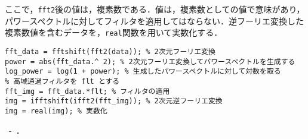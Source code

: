 ここで，\texttt{fft2}後の値は，複素数である．値は，複素数としての値で意味があり，パワースペクトルに対してフィルタを適用してはならない．逆フーリエ変換した複素数値を含むデータを，\texttt{real}関数を用いて実数化する．
\begin{lstlisting}[caption={2次元フーリエ変換と高域通過フィルタ},label={src:2次元フーリエ変換と高域通過フィルタ}]
% 画像データを data とする
fft_data = fftshift(fft2(data)); % 2次元フーリエ変換
power = abs(fft_data.^ 2); % 2次元フーリエ変換してパワースペクトルを生成する
log_power = log(1 + power); % 生成したパワースペクトルに対して対数を取る
% 高域通過フィルタを flt とする
fft_img = fft_data.*flt; % フィルタの適用
img = ifftshift(ifft2(fft_img)); % 2次元逆フーリエ変換
img = real(img); % 実数化
	\end{lstlisting}
\ -\ ．